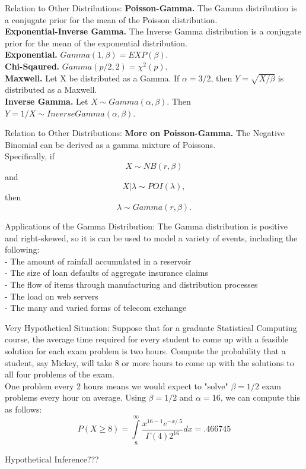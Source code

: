 \documentclass{beamer}
\begin{document}
\begin{frame}{Relation to Other Distributions:}
  \textbf{Poisson-Gamma.} The Gamma distribution is a conjugate prior 
  for the mean of the Poisson distribution.\\
  \textbf{Exponential-Inverse Gamma.} The Inverse Gamma distribution is a 
  conjugate prior for the mean of the exponential distribution. \\
  \wl
  \textbf{Exponential.} $Gamma(1,\beta) = EXP(\beta)$.\\
  \textbf{Chi-Sqaured.} $Gamma(p/2,2) = \chi ^2 (p)$.\\
  \textbf{Maxwell.} Let X be distributed as a Gamma. If $\alpha = 3/2$, then $Y = \sqrt{X/\beta}$ is distributed as a Maxwell.\\
  \textbf{Inverse Gamma.} Let $X \sim Gamma(\alpha,\beta)$. Then $Y = 1/X \sim InverseGamma(\alpha,\beta)$.\\
\end{frame}

\begin{frame}{Relation to Other Distributions:}
  \textbf{More on Poisson-Gamma.} The Negative Binomial can be derived as a gamma mixture of Poissons.\\
  \wl
  Specifically, if
  \[
     X \sim NB (r,\beta)
  \]
  and
  \[
    X|\lambda \sim POI(\lambda),
  \]
  then
  \[
    \lambda \sim Gamma(r,\beta).
  \]
\end{frame}

\begin{frame}{Applications of the Gamma Distribution:}
  The Gamma distribution is positive and right-skewed, so it is can be used to model a variety of events, including the following:\\
    \wl 
    - The amount of rainfall accumulated in a reservoir\\
    - The size of loan defaults of aggregate insurance claims\\
    - The flow of items through manufacturing and distribution processes\\
    - The load on web servers\\
    - The many and varied forms of telecom exchange
\end{frame}

\begin{frame}{Very Hypothetical Situation:}
  Suppose that for a graduate Statistical Computing course, the average time required for every student to come up with a feasible solution for each exam problem is two hours. Compute the probability that a student, say Mickey, will take 8 or more hours to come up with the solutions to all four problems of the exam.\\
\wl
One problem every 2 hours means we would expect to "solve" $\beta = 1/2$ exam problems every hour on average. Using $\beta = 1/2 $ and $\alpha = 16$, we can compute this as follows:
\[
  P(X \ge 8) = \int\limits_8^\infty {\frac{x^{16-1}e^{-x/.5}}{\Gamma(4)2^{16} }dx}
             = .466745
\]

Hypothetical Inference???
\end{frame}
\end{document}
